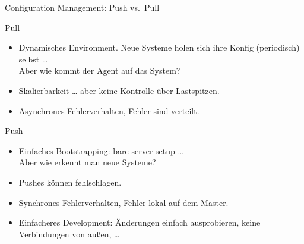 \begin{frame}{Configuration Management: Push vs.~Pull}
  \begin{block}{Pull}
    \begin{itemize}
      \item Dynamisches Environment.  Neue Systeme holen sich ihre
      Konfig (periodisch) selbst \dots{}\\ Aber wie kommt der Agent auf
      das System?

      \item Skalierbarkeit \dots{} aber keine Kontrolle über Lastspitzen.

      \item Asynchrones Fehlerverhalten, Fehler sind verteilt.
    \end{itemize}
  \end{block}

  \pause
  \begin{block}{Push}
    \begin{itemize}
      \item Einfaches Bootstrapping: bare server setup \dots{}\\ Aber
      wie erkennt man neue Systeme?

      \item Pushes können fehlschlagen.

      \item Synchrones Fehlerverhalten, Fehler lokal auf dem Master.

      \item Einfacheres Development: Änderungen einfach ausprobieren,
      keine Verbindungen von außen, \dots
    \end{itemize}
  \end{block}

\end{frame}


